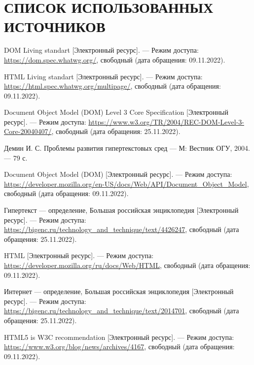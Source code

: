 \section*{СПИСОК ИСПОЛЬЗОВАННЫХ ИСТОЧНИКОВ}

\begingroup
\renewcommand{\section}[2]{}
\begin{thebibliography}{}
	
	DOM Living standart [Электронный ресурс]. --- Режим доступа: \url{https://dom.spec.whatwg.org/}, свободный (дата обращения: 09.11.2022).
	
	HTML Living standart [Электронный ресурс]. --- Режим доступа: \url{https://html.spec.whatwg.org/multipage/}, свободный (дата обращения: 09.11.2022).
	
	Document Object Model (DOM) Level 3 Core Specification [Электронный ресурс]. --- Режим доступа: \url{https://www.w3.org/TR/2004/REC-DOM-Level-3-Core-20040407/}, свободный (дата обращения: 25.11.2022).
	
	Демин И. С. Проблемы развития гипертекстовых сред  --- М: Вестник ОГУ, 2004. --- 79 с.
	
	Document Object Model (DOM) [Электронный ресурс]. --- Режим доступа: \url{https://developer.mozilla.org/en-US/docs/Web/API/Document_Object_Model}, свободный (дата обращения: 09.11.2022).
	
	Гипертекст --- определение, Большая российская энциклопедия [Электронный ресурс]. --- Режим доступа: \url{https://bigenc.ru/technology_and_technique/text/4426247}, свободный (дата обращения: 25.11.2022).
	
	HTML [Электронный ресурс]. --- Режим доступа: \url{https://developer.mozilla.org/ru/docs/Web/HTML}, свободный (дата обращения: 09.11.2022).
	
	Интернет --- определение, Большая российская энциклопедия [Электронный ресурс]. --- Режим доступа: \url{https://bigenc.ru/technology_and_technique/text/2014701}, свободный (дата обращения: 25.11.2022).
	
	HTML5 is W3C recommendation [Электронный ресурс]. --- Режим доступа: \url{https://www.w3.org/blog/news/archives/4167}, свободный (дата обращения: 09.11.2022).
	

\end{thebibliography}
